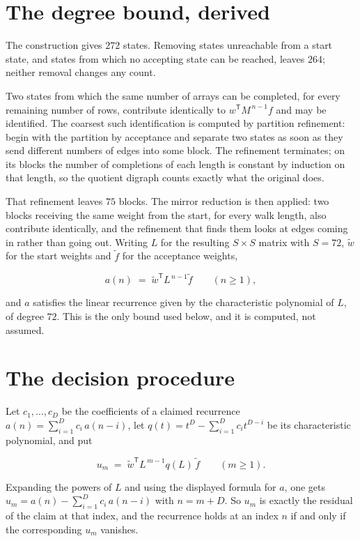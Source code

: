 \documentclass[11pt]{article}
\theoremstyle{definition}
\begin{document}
\section{The degree bound, derived}

The construction gives $272$ states. Removing states unreachable from a start state, and states from which no accepting state can be reached, leaves $264$; neither removal changes any count.

Two states from which the same number of arrays can be completed, for every remaining number of rows, contribute identically to $w^{\mathsf T}M^{\,n-1}f$ and may be identified. The coarsest such identification is computed by partition refinement: begin with the partition by acceptance and separate two states as soon as they send different numbers of edges into some block. The refinement terminates; on its blocks the number of completions of each length is constant by induction on that length, so the quotient digraph counts exactly what the original does.

That refinement leaves $75$ blocks. The mirror reduction is then applied: two blocks receiving the same weight from the start, for every walk length, also contribute identically, and the refinement that finds them looks at edges coming in rather than going out. Writing $L$ for the resulting $S \times S$ matrix with $S = 72$, $\tilde w$ for the start weights and $\tilde f$ for the acceptance weights,

\[a(n) \;=\; \tilde w^{\mathsf T} L^{\,n-1} \tilde f \qquad (n \ge 1),\]

and $a$ satisfies the linear recurrence given by the characteristic polynomial of $L$, of degree $72$. This is the only bound used below, and it is computed, not assumed.

\section{The decision procedure}

Let $c_1,\dots,c_D$ be the coefficients of a claimed recurrence $a(n) = \sum_{i=1}^{D} c_i\,a(n-i)$, let $q(t) = t^{D} - \sum_{i=1}^{D} c_i t^{D-i}$ be its characteristic polynomial, and put

\[u_m \;=\; \tilde w^{\mathsf T} L^{\,m-1} q(L)\,\tilde f \qquad (m \ge 1).\]

Expanding the powers of $L$ and using the displayed formula for $a$, one gets $u_m = a(n) - \sum_{i=1}^{D} c_i\,a(n-i)$ with $n = m + D$. So $u_m$ is exactly the residual of the claim at that index, and the recurrence holds at an index $n$ if and only if the corresponding $u_m$ vanishes.
\end{document}
